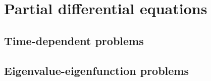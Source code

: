 \section{Partial differential equations}



\subsection{Time-dependent problems}

\subsection{Eigenvalue-eigenfunction problems}

\stopchapter
